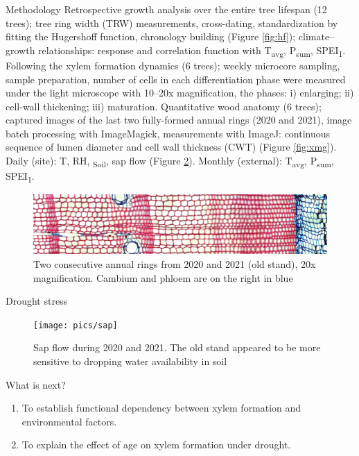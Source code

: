 \documentclass[final]{beamer}
\newlength{\colwidth}
\begin{document}
\begin{frame}[t]
\begin{columns}[t]
\begin{column}{\colwidth}
\begin{block}{Methodology}
        Retrospective growth analysis over the entire tree lifespan (12 trees); tree ring width (TRW) measurements, cross-dating, standardization by fitting the Hugershoff function, chronology building (Figure \ref{fig:hf}); climate--growth relationships: response and correlation function with T\textsubscript{avg}, P\textsubscript{sum}, SPEI\textsubscript{1}.
        Following the xylem formation dynamics (6 trees); weekly microcore sampling, sample preparation, number of cells in each differentiation phase were measured under the light microscope with 10--20x magnification, the phases: i) enlarging; ii) cell-wall thickening; iii) maturation.
        Quantitative wood anatomy (6 trees); captured images of the last two fully-formed annual rings (2020 and 2021), image batch processing with ImageMagick, measurements with ImageJ: continuous sequence of lumen diameter and cell wall thickness (CWT) (Figure \ref{fig:xmg}).
        Daily (site): T, RH, \Psi\textsubscript{Soil}, sap flow (Figure \ref{fig:sap}). Monthly (external): T\textsubscript{avg}, P\textsubscript{sum}, SPEI\textsubscript{1}.
        \begin{figure}
            \centering \includegraphics[width=1\textwidth]{pics/sob}
            \caption{Two consecutive annual rings from 2020 and 2021 (old stand), 20x magnification. Cambium and phloem are on the right in blue}
            \label{fig:sob}
        \end{figure}
\end{block}

\begin{block}{Drought stress}
        \begin{figure}
            \centering \texttt{[image: pics/sap]}
            \caption{Sap flow during 2020 and 2021. The old stand appeared to be more sensitive to dropping water availability in soil}
            \label{fig:sap}
        \end{figure}
\end{block}

\begin{block}{What is next?}
    \raggedleft
    \begin{enumerate}
        \item To establish functional dependency between xylem formation and environmental factors.
        \item To explain the effect of age on xylem formation under drought.
    \end{enumerate}
\end{block}


\end{column}
\end{columns}
\end{frame}
\end{document}

